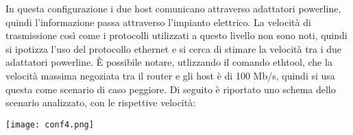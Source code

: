 \documentclass[../lab2.tex]{subfiles}
\begin{document}
    In questa configurazione i due host comunicano attraverso adattatori powerline,
    quindi l'informazione passa attraverso l'impianto elettrico.
    La velocità di trasmissione così come i protocolli utilizzati a questo livello
    non sono noti, quindi si ipotizza l'uso del protocollo ethernet e si cerca di 
    stimare la velocità tra i due adattatori powerline.
    È possibile notare, utlizzando il comando ethtool, che la velocità massima negoziata
    tra il router e gli host è di 100 Mb/s, quindi si usa questa come scenario di caso peggiore. 
    Di seguito è riportato uno schema dello scenario analizzato, con le rispettive velocità:

    \begin{center}
        \texttt{[image: conf4.png]}
    \end{center}
\end{document}
